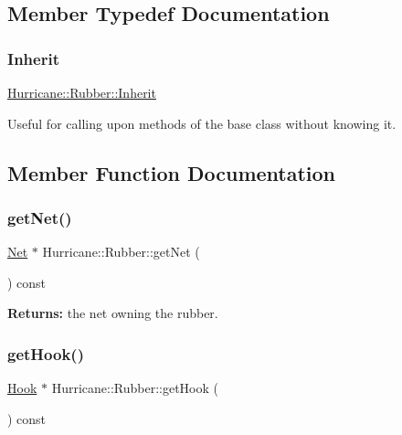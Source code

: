 \subsection{Member Typedef Documentation}
\mbox{\label{classHurricane_1_1Rubber_aa74649cee7cda714020e77194af2210a}} 
\subsubsection{\texorpdfstring{Inherit}{Inherit}}
{\footnotesize\ttfamily \mbox{\hyperlink{classHurricane_1_1Rubber_aa74649cee7cda714020e77194af2210a}{Hurricane\+::\+Rubber\+::\+Inherit}}}

Useful for calling upon methods of the base class without knowing it. 

\subsection{Member Function Documentation}
\mbox{\label{classHurricane_1_1Rubber_a3d4156388d0a9e53daa00cdae9732e12}} 
\subsubsection{\texorpdfstring{get\+Net()}{getNet()}}
{\footnotesize\ttfamily \mbox{\hyperlink{classHurricane_1_1Net}{Net}} $\ast$ Hurricane\+::\+Rubber\+::get\+Net (\begin{DoxyParamCaption}{ }\end{DoxyParamCaption}) const\hspace{0.3cm}{\ttfamily [inline]}}

{\bfseries Returns\+:} the net owning the rubber. \mbox{\label{classHurricane_1_1Rubber_a9f7b9bc21b4df4c2bac602f045477711}} 
\subsubsection{\texorpdfstring{get\+Hook()}{getHook()}}
{\footnotesize\ttfamily \mbox{\hyperlink{classHurricane_1_1Hook}{Hook}} $\ast$ Hurricane\+::\+Rubber\+::get\+Hook (\begin{DoxyParamCaption}{ }\end{DoxyParamCaption}) const\hspace{0.3cm}{\ttfamily [inline]}}

